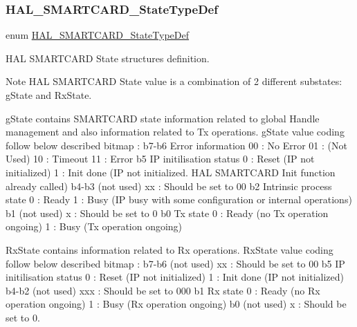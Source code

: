 \subsubsection{\texorpdfstring{H\+A\+L\+\_\+\+S\+M\+A\+R\+T\+C\+A\+R\+D\+\_\+\+State\+Type\+Def}{HAL\_SMARTCARD\_StateTypeDef}}
{\footnotesize\ttfamily enum \hyperlink{group___s_m_a_r_t_c_a_r_d___exported___types_ga79d6a3b95636861dcfd70913746e087e}{H\+A\+L\+\_\+\+S\+M\+A\+R\+T\+C\+A\+R\+D\+\_\+\+State\+Type\+Def}}



H\+AL S\+M\+A\+R\+T\+C\+A\+RD State structures definition. 

\begin{DoxyNote}{Note}
H\+AL S\+M\+A\+R\+T\+C\+A\+RD State value is a combination of 2 different substates\+: g\+State and Rx\+State.
\begin{DoxyItemize}
\item g\+State contains S\+M\+A\+R\+T\+C\+A\+RD state information related to global Handle management and also information related to Tx operations. g\+State value coding follow below described bitmap \+: b7-\/b6 Error information 00 \+: No Error 01 \+: (Not Used) 10 \+: Timeout 11 \+: Error b5 IP initilisation status 0 \+: Reset (IP not initialized) 1 \+: Init done (IP not initialized. H\+AL S\+M\+A\+R\+T\+C\+A\+RD Init function already called) b4-\/b3 (not used) xx \+: Should be set to 00 b2 Intrinsic process state 0 \+: Ready 1 \+: Busy (IP busy with some configuration or internal operations) b1 (not used) x \+: Should be set to 0 b0 Tx state 0 \+: Ready (no Tx operation ongoing) 1 \+: Busy (Tx operation ongoing)
\item Rx\+State contains information related to Rx operations. Rx\+State value coding follow below described bitmap \+: b7-\/b6 (not used) xx \+: Should be set to 00 b5 IP initilisation status 0 \+: Reset (IP not initialized) 1 \+: Init done (IP not initialized) b4-\/b2 (not used) xxx \+: Should be set to 000 b1 Rx state 0 \+: Ready (no Rx operation ongoing) 1 \+: Busy (Rx operation ongoing) b0 (not used) x \+: Should be set to 0. 
\end{DoxyItemize}
\end{DoxyNote}
